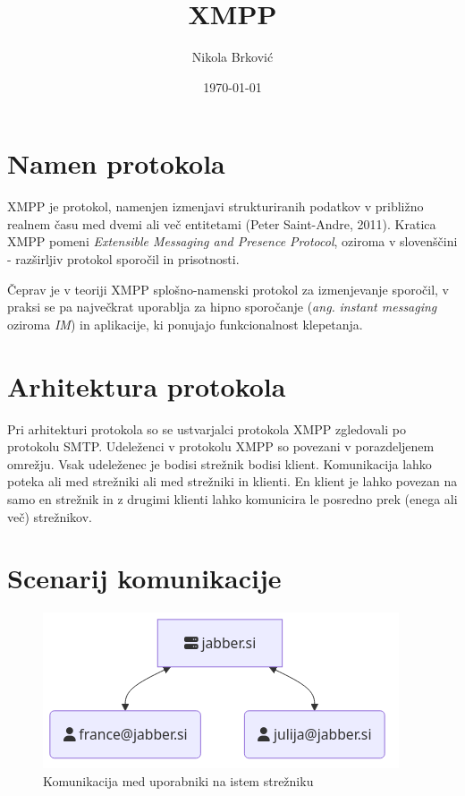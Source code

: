 \documentclass[11pt]{article}
\author{Nikola Brković}
\date{\today}
\title{XMPP}
\begin{document}
\maketitle

\section{Namen protokola}
\label{sec:org39d9d94}

XMPP je protokol, namenjen izmenjavi strukturiranih podatkov v
približno realnem času med dvemi ali več entitetami
(Peter Saint-Andre, 2011). Kratica XMPP pomeni \emph{Extensible Messaging and Presence
Protocol}, oziroma v slovenščini - razširljiv protokol sporočil in
prisotnosti.

Čeprav je v teoriji XMPP splošno-namenski protokol za izmenjevanje
sporočil, v praksi se pa največkrat uporablja za hipno sporočanje
(\emph{ang.} \emph{instant messaging} oziroma \emph{IM}) in aplikacije, ki ponujajo
funkcionalnost klepetanja.

\section{Arhitektura protokola}
\label{sec:org61ed453}

Pri arhitekturi protokola so se ustvarjalci protokola XMPP zgledovali
po protokolu SMTP. Udeleženci v protokolu XMPP so povezani v
porazdeljenem omrežju. Vsak udeleženec je bodisi strežnik bodisi
klient. Komunikacija lahko poteka ali med strežniki ali med strežniki
in klienti. En klient je lahko povezan na samo en strežnik in z
drugimi klienti lahko komunicira le posredno prek (enega ali več)
strežnikov.

\section{Scenarij komunikacije}
\label{sec:orge7f4769}

\begin{figure}[H]
\centering
\includegraphics[width=.9\linewidth]{images/local-server.png}
\caption{Komunikacija med uporabniki na istem strežniku}
\end{figure}
\end{document}
